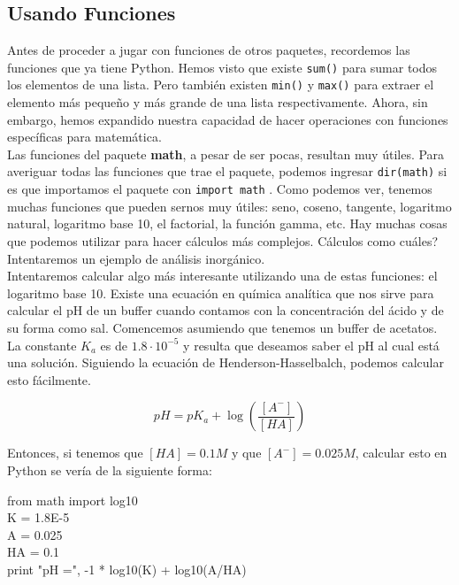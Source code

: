 \documentclass[10pt,letterpaper]{article}
\newcommand{\inlinecode}[1]{
\colorbox{light-gray}{\texttt{#1}}
}
\newenvironment{Code}
{
\begin{lrbox}{\selvestebox}%
\begin{minipage}{\dimexpr\columnwidth-2\fboxsep\relax}
\fontfamily{\ttdefault}\selectfont
}
{\end{minipage}\end{lrbox}%
\begin{center}
\colorbox{light-gray}{\usebox{\selvestebox}}
\end{center}
}
\begin{document}
\subsection{Usando Funciones}
Antes de proceder a jugar con funciones de otros paquetes, recordemos las funciones que ya tiene Python. Hemos visto que existe \inlinecode{sum()} para sumar todos los elementos de una lista. Pero tambi\'en existen \inlinecode{min()} y \inlinecode{max()} para extraer el elemento m\'as peque\~no y m\'as grande de una lista respectivamente. Ahora, sin embargo, hemos expandido nuestra capacidad de hacer operaciones con funciones espec\'ificas para matem\'atica.\\

Las funciones del paquete \textbf{math}, a pesar de ser pocas, resultan muy \'utiles. Para averiguar todas las funciones que trae el paquete, podemos ingresar \inlinecode{dir(math)} si es que importamos el paquete con \inlinecode{import math}. Como podemos ver, tenemos muchas funciones que pueden sernos muy \'utiles: seno, coseno, tangente, logaritmo natural, logaritmo base 10, el factorial, la funci\'on gamma, etc. Hay muchas cosas que podemos utilizar para hacer c\'alculos m\'as complejos. C\'alculos como cu\'ales? Intentaremos un ejemplo de an\'alisis inorg\'anico.\\

Intentaremos calcular algo m\'as interesante utilizando una de estas funciones: el logaritmo base 10. Existe una ecuaci\'on en qu\'imica anal\'itica que nos sirve para calcular el pH de un buffer cuando contamos con la concentraci\'on del \'acido y de su forma como sal. Comencemos asumiendo que tenemos un buffer de acetatos. La constante $K_a $ es de $ 1.8 \cdot 10^{-5}$ y resulta que deseamos saber el pH al cual est\'a una soluci\'on. Siguiendo la ecuaci\'on de Henderson-Hasselbalch, podemos calcular esto f\'acilmente.

\begin{equation}
pH = pK_a + \log \left( \frac{\left[A^-\right]}{\left[HA\right]} \right)
\end{equation}

Entonces, si tenemos que $\left[HA\right] = 0.1 M$ y que $\left[A^-\right] = 0.025 M$, calcular esto en Python se ver\'ia de la siguiente forma:

\begin{Code}
from math import log10\\
K = 1.8E-5\\
A = 0.025\\
HA = 0.1\\
print "pH =", -1 * log10(K) + log10(A/HA)
\end{Code}
\end{document}
